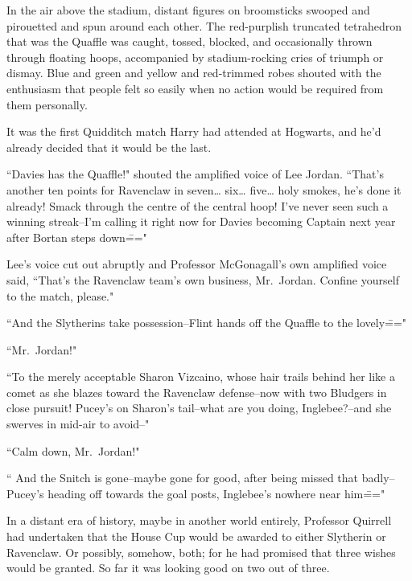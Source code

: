 \later

In the air above the stadium, distant figures on broomsticks swooped and pirouetted and spun around each other. The red-purplish truncated tetrahedron that was the Quaffle was caught, tossed, blocked, and occasionally thrown through floating hoops, accompanied by stadium-rocking cries of triumph or dismay. Blue and green and yellow and red-trimmed robes shouted with the enthusiasm that people felt so easily when no action would be required from them personally.

It was the first Quidditch match Harry had attended at Hogwarts, and he'd already decided that it would be the last.

``Davies has the Quaffle!" shouted the amplified voice of Lee Jordan. ``That's another ten points for Ravenclaw in seven{\ldots} six{\ldots} five{\ldots} holy smokes, he's done it already! Smack through the centre of the central hoop! I've never seen such a winning streak\---I'm calling it right now for Davies becoming Captain next year after Bortan steps down\==="

Lee's voice cut out abruptly and Professor McGonagall's own amplified voice said, ``That's the Ravenclaw team's own business, Mr.~Jordan. Confine yourself to the match, please."

``And the Slytherins take possession\---Flint hands off the Quaffle to the lovely\==="

``Mr.~Jordan!"

``To the merely acceptable Sharon Vizcaino, whose hair trails behind her like a comet as she blazes toward the Ravenclaw defense\---now with two Bludgers in close pursuit! Pucey's on Sharon's tail\---what are you doing, Inglebee?\---and she swerves in mid-air to avoid\---"

``Calm down, Mr.~Jordan!"

`` And the Snitch is gone\---maybe gone for good, after being missed that badly\---Pucey's heading off towards the goal posts, Inglebee's nowhere near him\==="

In a distant era of history, maybe in another world entirely, Professor Quirrell had undertaken that the House Cup would be awarded to either Slytherin or Ravenclaw. Or possibly, somehow, both; for he had promised that three wishes would be granted. So far it was looking good on two out of three.

